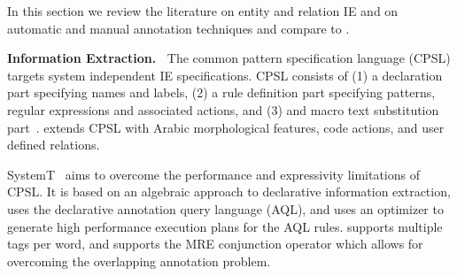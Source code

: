 In this section we review the literature on 
entity and relation IE and on automatic and manual annotation
techniques and compare to \framework.


\begin{table}[tb!]
\caption{Comaprison of \framework with SystemT, 
TEXTMARKER, 
Urbain, 
QARAB}
\label{tab:iecomp}
\end{table}

{\bf Information Extraction.~}
The common pattern specification language (CPSL) targets system independent 
IE specifications. 
CPSL consists of 
(1) a declaration part specifying names and labels, 
(2) a rule definition part specifying patterns, regular expressions and associated actions, and 
(3) and macro text substitution part~\cite{appelt1998common}.
\framework extends CPSL with Arabic morphological features, code actions, and user defined relations.

SystemT~\cite{chiticariu2010systemt}
aims to overcome the performance and expressivity limitations of CPSL.
It is based on an algebraic approach to declarative information extraction,
uses the declarative annotation query language (AQL), and uses
an optimizer to generate high performance execution plans for the AQL rules. 
\framework supports multiple tags per word, and supports the MRE conjunction operator
which allows for overcoming the overlapping annotation problem. 

